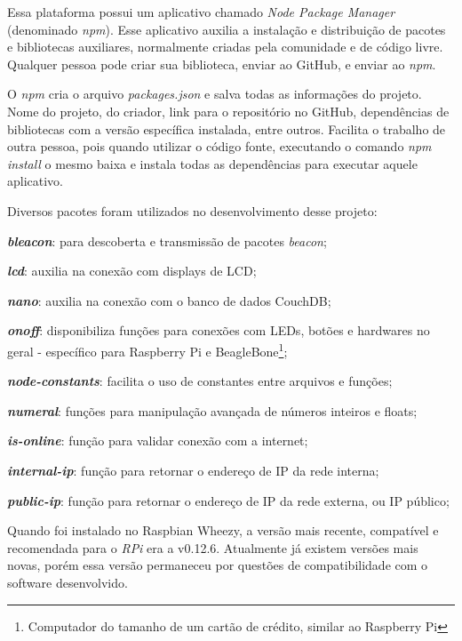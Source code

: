 Essa plataforma possui um aplicativo chamado \textit{Node Package Manager} (denominado \textit{npm}). Esse aplicativo auxilia a instalação e distribuição de pacotes e bibliotecas auxiliares, normalmente criadas pela comunidade e de código livre. Qualquer pessoa pode criar sua biblioteca, enviar ao GitHub, e enviar ao \textit{npm}.

O \textit{npm} cria o arquivo \textit{packages.json} e salva todas as informações do projeto. Nome do projeto, do criador, link para o repositório no GitHub, dependências de bibliotecas com a versão específica instalada, entre outros. Facilita o trabalho de outra pessoa, pois quando utilizar o código fonte, executando o comando \textit{npm install} o mesmo baixa e instala todas as dependências para executar aquele aplicativo.

Diversos pacotes foram utilizados no desenvolvimento desse projeto:

\begin{alineas}
	\item \textbf{\textit{bleacon}}: para descoberta e transmissão de pacotes \textit{beacon};
	\item \textbf{\textit{lcd}}: auxilia na conexão com displays de LCD;
	\item \textbf{\textit{nano}}: auxilia na conexão com o banco de dados CouchDB;
	\item \textbf{\textit{onoff}}: disponibiliza funções para conexões com LEDs, botões e hardwares no geral - específico para Raspberry Pi e BeagleBone\footnote{Computador do tamanho de um cartão de crédito, similar ao Raspberry Pi};
	\item \textbf{\textit{node-constants}}: facilita o uso de constantes entre arquivos e funções;
	\item \textbf{\textit{numeral}}: funções para manipulação avançada de números inteiros e floats;
	\item \textbf{\textit{is-online}}: função para validar conexão com a internet;
	\item \textbf{\textit{internal-ip}}: função para retornar o endereço de IP da rede interna;
	\item \textbf{\textit{public-ip}}: função para retornar o endereço de IP da rede externa, ou IP público;
\end{alineas}

Quando foi instalado no Raspbian Wheezy, a versão mais recente, compatível e recomendada para o \textit{RPi} era a v0.12.6. Atualmente já existem versões mais novas, porém essa versão permaneceu por questões de compatibilidade com o software desenvolvido.

